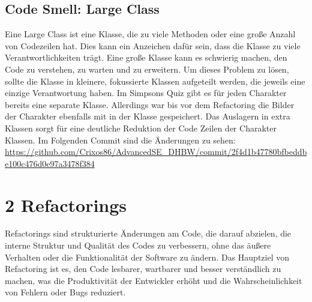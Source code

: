 \subsection{Code Smell: Large Class}
Eine Large Class ist eine Klasse, die zu viele Methoden oder eine große Anzahl von Codezeilen hat. Dies kann ein Anzeichen dafür sein, dass die Klasse zu viele Verantwortlichkeiten trägt. Eine große Klasse kann es schwierig machen, den Code zu verstehen, zu warten und zu erweitern. Um dieses Problem zu lösen, sollte die Klasse in kleinere, fokussierte Klassen aufgeteilt werden, die jeweils eine einzige Verantwortung haben. Im Simpsons Quiz gibt es für jeden Charakter bereits eine separate Klasse. Allerdings war bis vor dem Refactoring die Bilder der Charakter ebenfalls mit in der Klasse gespeichert. Das Auslagern in extra Klassen sorgt für eine deutliche Reduktion der Code Zeilen der Charakter Klassen. Im Folgenden Commit sind die Änderungen zu sehen:
\url{https://github.com/Crixos86/AdvancedSE_DHBW/commit/2f4d1b47780bfbeddbe100c476d0e97a3478f384}

\newpage
\section{2 Refactorings}
Refactorings sind strukturierte Änderungen am Code, die darauf abzielen, die interne Struktur und Qualität des Codes zu verbessern, ohne das äußere Verhalten oder die Funktionalität der Software zu ändern. Das Hauptziel von Refactoring ist es, den Code lesbarer, wartbarer und besser verständlich zu machen, was die Produktivität der
Entwickler erhöht und die Wahrscheinlichkeit von Fehlern oder Bugs reduziert.
